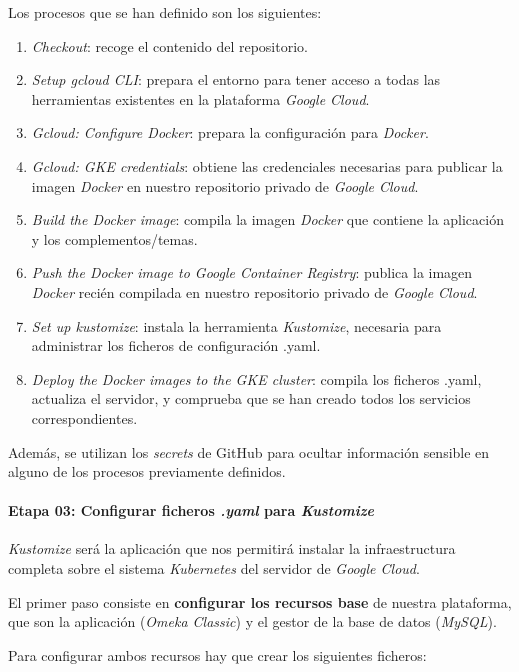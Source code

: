 Los procesos que se han definido son los siguientes:

\begin{enumerate}
\def\labelenumi{\arabic{enumi}.}
\tightlist
\item
  \emph{Checkout}: recoge el contenido del repositorio.
\item
  \emph{Setup gcloud CLI}: prepara el entorno para tener acceso a todas
  las herramientas existentes en la plataforma \emph{Google Cloud}.
\item
  \emph{Gcloud: Configure Docker}: prepara la configuración para
  \emph{Docker}.
\item
  \emph{Gcloud: GKE credentials}: obtiene las credenciales necesarias
  para publicar la imagen \emph{Docker} en nuestro repositorio privado
  de \emph{Google Cloud}.
\item
  \emph{Build the Docker image}: compila la imagen \emph{Docker} que
  contiene la aplicación y los complementos/temas.
\item
  \emph{Push the Docker image to Google Container Registry}: publica la
  imagen \emph{Docker} recién compilada en nuestro repositorio privado
  de \emph{Google Cloud}.
\item
  \emph{Set up kustomize}: instala la herramienta \emph{Kustomize},
  necesaria para administrar los ficheros de configuración .yaml.
\item
  \emph{Deploy the Docker images to the GKE cluster}: compila los
  ficheros .yaml, actualiza el servidor, y comprueba que se han creado
  todos los servicios correspondientes.
\end{enumerate}

Además, se utilizan los \emph{secrets} de GitHub para ocultar
información sensible en alguno de los procesos previamente definidos.

\paragraph{Etapa 03: Configurar ficheros \emph{.yaml} para \emph{Kustomize}} 
\emph{Kustomize} será la aplicación que nos permitirá instalar la
infraestructura completa sobre el sistema \emph{Kubernetes} del servidor
de \emph{Google Cloud}.

El primer paso consiste en \textbf{configurar los recursos base} de
nuestra plataforma, que son la aplicación (\emph{Omeka Classic}) y el
gestor de la base de datos (\emph{MySQL}).

Para configurar ambos recursos hay que crear los siguientes ficheros:

